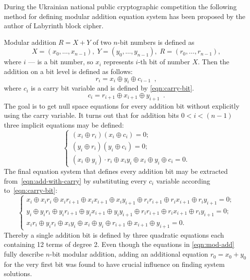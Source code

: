 During the Ukrainian national public cryptographic competition the following
method for defining modular addition equation system has been proposed by the
author of Labyrinth block cipher.

Modular addition $R = X + Y$ of two $n$-bit numbers is defined as 
\begin{equation}
\label{eqn:add}
X = (x_0, \hdots, x_{n-1}), \; 
Y = (y_0, \hdots, y_{n-1}), \;
R = (r_0, \hdots, r_{n-1}),
\end{equation}
where $i$ --- is a bit number, so $x_i$ represents $i$-th bit of number $X$. 
Then the addition on a bit level is defined as follows:
\begin{equation}
\label{eqn:trivial-mod-add}
r_i = x_i \oplus y_i \oplus c_{i-1} \enspace,
\end{equation}
where $c_i$ is a carry bit variable and is defined by \eqref{eqn:carry-bit}.
\begin{equation}
\label{eqn:carry-bit}
c_i = r_{i+1} \oplus x_{i+1} \oplus y_{i+1} \enspace.
\end{equation}
The goal is to get null space equations for every addition bit without
explicitly using the carry variable. It turns out that for addition bits 
$0 < i < (n - 1)$ three implicit equations may be defined:
\begin{equation}
\label{eqn:add-with-carry}
\left\{
	\begin{array}{ll}
        (x_i \oplus r_i) (x_i \oplus c_i) = 0; \\
        (y_i \oplus r_i) (y_i \oplus c_i) = 0; \\
        (x_i \oplus y_i) \cdot r_i \oplus x_i y_i \oplus x_i \oplus y_i \oplus c_i = 0.
	\end{array} \right.
\end{equation}
The final equation system that defines every addition bit may be extracted
from~\eqref{eqn:add-with-carry} by substituting every $c_i$ variable according
to~\ref{eqn:carry-bit}:
\begin{equation}
\label{eqn:mod-add}
\left\{
	\begin{array}{ll}
        x_i \oplus x_i r_i \oplus x_i r_{i+1} \oplus x_i x_{i+1} \oplus x_i y_{i+1} \oplus r_i r_{i+1} \oplus r_i x_{i+1} \oplus r_i y_{i+1} = 0; \\
        y_i \oplus y_i r_i \oplus y_i r_{i+1} \oplus y_i x_{i+1} \oplus y_i y_{i+1} \oplus r_i r_{i+1} \oplus r_i x_{i+1} \oplus r_i y_{i+1} = 0; \\
        x_i r_i \oplus y_i r_i \oplus x_i y_i \oplus x_i \oplus y_i \oplus r_{i+1} \oplus x_{i+1} \oplus y_{i+1} = 0.
	\end{array} \right.
\end{equation}
Thereby a single addition bit is defined by three quadratic equations each
containing 12 terms of degree 2. Even though the equations in
\eqref{eqn:mod-add} fully describe $n$-bit modular addition, adding an
additional equation $r_0 = x_0 + y_0$ for the very first bit was found to have
crucial influence on finding system solutions.

